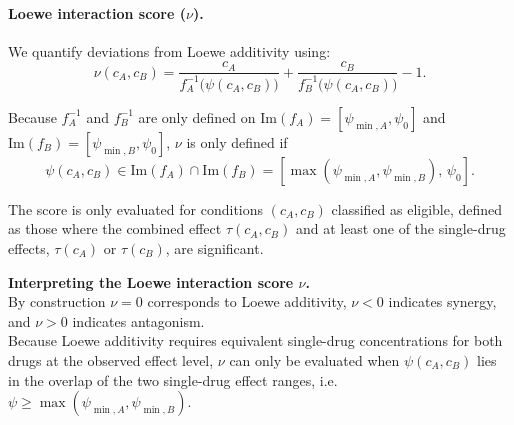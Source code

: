 \paragraph{Loewe interaction score (\(\nu\)).}
We quantify deviations from Loewe additivity using:
\begin{equation}
  \nu(c_A,c_B) =
  \frac{c_A}{f_A^{-1}\!\big(\psi(c_A,c_B)\big)} +
  \frac{c_B}{f_B^{-1}\!\big(\psi(c_A,c_B)\big)} -1.
  \label{eq:fici_si}
\end{equation}

Because \(f_A^{-1}\) and \(f_B^{-1}\) are only defined on \(\mathrm{Im}(f_A)=[\psi_{\min,A},\psi_{0}]\) and \(\mathrm{Im}(f_B)=[\psi_{\min,B},\psi_{0}]\), \(\nu\) is only defined if
\begin{equation}
  \psi(c_A,c_B)\in \mathrm{Im}(f_A)\cap \mathrm{Im}(f_B)=[\max(\psi_{\min,A},\psi_{\min,B}),\,\psi_{0}].
  \label{eq:loewe_domain}
\end{equation}

The score is only evaluated for conditions \((c_A,c_B)\) classified as eligible, defined as those where the combined effect \(\tau(c_A,c_B)\) and at least one of the single-drug effects, \(\tau(c_A)\) or \(\tau(c_B)\), are significant.

\begin{mdframed}[linewidth=0.8pt,backgroundcolor=gray!5,roundcorner=3pt]
  \textbf{Interpreting the Loewe interaction score \(\nu\).}\\[3pt]
  By construction \(\nu=0\) corresponds to Loewe additivity, \(\nu<0\) indicates synergy, and \(\nu>0\) indicates antagonism.\\
  Because Loewe additivity requires equivalent single-drug concentrations for both drugs at the observed effect level, \(\nu\) can only be evaluated when \(\psi(c_A,c_B)\) lies in the overlap of the two single-drug effect ranges, i.e.\ \(\psi\ge \max(\psi_{\min,A},\psi_{\min,B})\).
\end{mdframed}

